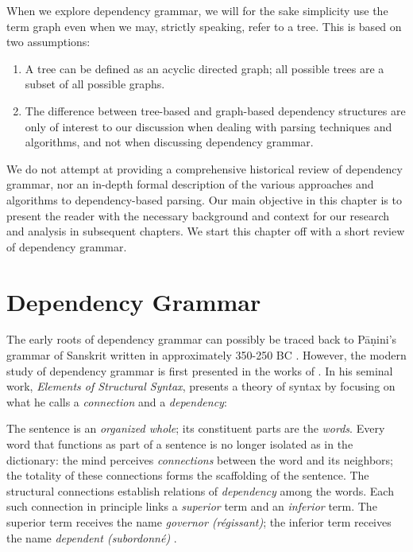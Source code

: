 When we explore dependency grammar, we will for the sake simplicity use the term graph even when we may, strictly speaking, refer to a tree. This is based on two assumptions:

\begin{enumerate}
\item A tree can be defined as an acyclic directed graph; all possible trees are a subset of all possible graphs.
\item The difference between tree-based and graph-based dependency structures are only of interest to our discussion when dealing with parsing techniques and algorithms, and not when discussing dependency grammar.
\end{enumerate}

We do not attempt at providing a comprehensive historical review of dependency grammar, nor an in-depth formal description of the various approaches and algorithms to dependency-based parsing. Our main objective in this chapter is to present the reader with the necessary background and context for our research and analysis in subsequent chapters. We start this chapter off with a short review of dependency grammar.

\section{Dependency Grammar}
\label{grammar}

The early roots of dependency grammar can possibly be traced back to P\={a}\d{n}ini's grammar of Sanskrit written in approximately 350-250 BC \cite{Kruijff:02}. However, the modern study of  dependency grammar is first presented in the works of \citeauthor{Tes:15}. In his seminal work, \textit{Elements of Structural Syntax}, \citeauthor{Tes:15} presents a theory of syntax by focusing on what he calls a \textit{connection} and a \textit{dependency}:

\begin{displayquote}
The sentence is an \textit{organized whole}; its constituent parts are the \textit{words}. Every word that functions as part of a sentence is no longer isolated as in the dictionary: the mind perceives \textit{connections} between the word and its neighbors; the totality of these connections forms the scaffolding of the sentence. The structural connections establish relations of \textit{dependency} among the words. Each such connection in principle links a \textit{superior} term and an \textit{inferior} term. The superior term receives the name \textit{governor (r\'{e}gissant)}; the inferior term receives the name \textit{dependent (subordonn\'{e})} \cite{Tes:15}.
\end{displayquote}

